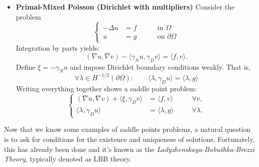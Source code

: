\documentclass{article}
\begin{document}
\begin{itemize}
    \item \textbf{Primal-Mixed Poisson (Dirichlet with multipliers)}
    Consider the problem
    \begin{displaymath}
    \left\{
    \begin{aligned}
        -\Delta u &= f &&\quad\text{ in } \Omega \\ 
        u &= g &&\quad\text{ on } \partial\Omega
    \end{aligned}
    \right.
    \end{displaymath}
    Integration by parts yields:
    \begin{displaymath}
        (\nabla u, \nabla v) 
        - \langle \gamma_N u, \gamma_D v \rangle
        = \langle f,v \rangle.
    \end{displaymath}
    Define \(\xi = -\gamma_N u\) and impose Dirichlet boundary
    conditions weakly. That is,
    \begin{displaymath}
        \forall \lambda \in H^{-1/2}(\partial\Omega)
        \colon\qquad
        \langle \lambda, \gamma_D u \rangle
        =
        \langle \lambda, g \rangle
    \end{displaymath}
    Writing everything together shows a saddle point problem:
    \begin{displaymath}
    \left\{
    \begin{aligned}
        (\nabla u, \nabla v) + \langle \xi, \gamma_D v \rangle
        &= \langle f,v \rangle
        &&\quad \forall v,\\ 
        \langle \lambda, \gamma_D u \rangle &= \langle \lambda, g \rangle
        &&\quad  \forall \lambda.
    \end{aligned}
    \right.
    \end{displaymath}
\end{itemize}

Now that we know some examples of saddle points problems, a natural
question is to ask for conditions for the existence and uniqueness
of solutions. Fortunately, this has already been done and it's known
as the \emph{Ladyzhenskaya-Babu\v{s}hka-Brezzi Theory}, typically denoted as LBB theory.
\end{document}
